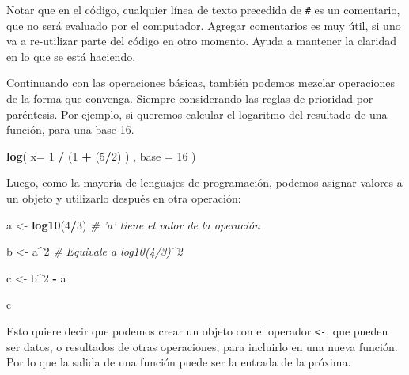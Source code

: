 \documentclass[12pt,letterpaper,]{book}
\newenvironment{Shaded}{\begin{snugshade}}{\end{snugshade}}
\newcommand{\KeywordTok}[1]{\textcolor[rgb]{0.13,0.29,0.53}{\textbf{#1}}}
\newcommand{\DataTypeTok}[1]{\textcolor[rgb]{0.13,0.29,0.53}{#1}}
\newcommand{\DecValTok}[1]{\textcolor[rgb]{0.00,0.00,0.81}{#1}}
\newcommand{\StringTok}[1]{\textcolor[rgb]{0.31,0.60,0.02}{#1}}
\newcommand{\CommentTok}[1]{\textcolor[rgb]{0.56,0.35,0.01}{\textit{#1}}}
\newcommand{\OperatorTok}[1]{\textcolor[rgb]{0.81,0.36,0.00}{\textbf{#1}}}
\newcommand{\NormalTok}[1]{#1}
\begin{document}
Notar que en el código, cualquier línea de texto precedida de
\texttt{\#} es un comentario, que no será evaluado por el computador.
Agregar comentarios es muy útil, si uno va a re-utilizar parte del
código en otro momento. Ayuda a mantener la claridad en lo que se está
haciendo.

Continuando con las operaciones básicas, también podemos mezclar
operaciones de la forma que convenga. Siempre considerando las reglas de
prioridad por paréntesis. Por ejemplo, si queremos calcular el logaritmo
del resultado de una función, para una base 16.

\begin{Shaded}
\begin{Highlighting}[]
\KeywordTok{log}\NormalTok{( }\DataTypeTok{x=} \DecValTok{1} \OperatorTok{/}\StringTok{ }\NormalTok{(}\DecValTok{1} \OperatorTok{+}\StringTok{ }\NormalTok{(}\DecValTok{5}\OperatorTok{/}\DecValTok{2}\NormalTok{) ) , }\DataTypeTok{base =} \DecValTok{16}\NormalTok{ )}
\end{Highlighting}
\end{Shaded}

Luego, como la mayoría de lenguajes de programación, podemos asignar
valores a un objeto y utilizarlo después en otra operación:

\begin{Shaded}
\begin{Highlighting}[]
\NormalTok{a <-}\StringTok{ }\KeywordTok{log10}\NormalTok{(}\DecValTok{4}\OperatorTok{/}\DecValTok{3}\NormalTok{)  }\CommentTok{# 'a' tiene el valor de la operación}

\NormalTok{b <-}\StringTok{ }\NormalTok{a}\OperatorTok{^}\DecValTok{2} \CommentTok{# Equivale a log10(4/3)^2}

\NormalTok{c <-}\StringTok{ }\NormalTok{b}\OperatorTok{^}\DecValTok{2} \OperatorTok{-}\StringTok{ }\NormalTok{a}

\NormalTok{c}
\end{Highlighting}
\end{Shaded}

Esto quiere decir que podemos crear un objeto con el operador
\texttt{\textless{}-}, que pueden ser datos, o resultados de otras
operaciones, para incluirlo en una nueva función. Por lo que la salida
de una función puede ser la entrada de la próxima.
\end{document}
